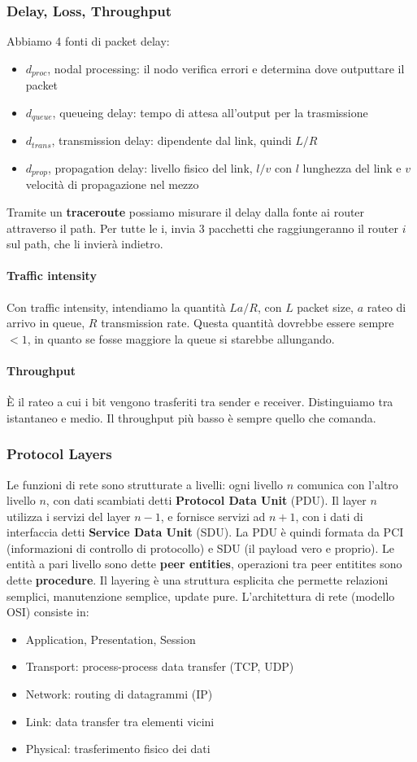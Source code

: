 \documentclass[11pt]{article}
\begin{document}
\subsubsection{Delay, Loss, Throughput}
Abbiamo 4 fonti di packet delay:
\begin{itemize}
    \item $d_{proc}$, nodal processing: il nodo verifica errori e determina dove outputtare il packet 
    \item $d_{queue}$, queueing delay: tempo di attesa all'output per la trasmissione
    \item $d_{trans}$, transmission delay: dipendente dal link, quindi $L/R$
    \item $d_{prop}$, propagation delay: livello fisico del link, $l/v$ con $l$ lunghezza del link e $v$ velocità di propagazione nel mezzo 
\end{itemize}
Tramite un \textbf{traceroute} possiamo misurare il delay dalla fonte ai router attraverso il path. Per tutte le i, invia 3 pacchetti che raggiungeranno il router $i$ sul path, che li invierà indietro. 
\paragraph{Traffic intensity} Con traffic intensity, intendiamo la quantità $La/R$, con $L$ packet size, $a$ rateo di arrivo in queue, $R$ transmission rate. Questa quantità dovrebbe essere sempre $<1$, in quanto se fosse maggiore la queue si starebbe allungando.
\paragraph{Throughput} È il rateo a cui i bit vengono trasferiti tra sender e receiver. Distinguiamo tra istantaneo e medio. Il throughput più basso è sempre quello che comanda.
\subsubsection{Protocol Layers}
Le funzioni di rete sono strutturate a livelli: ogni livello $n$ comunica con l'altro livello $n$, con dati scambiati detti \textbf{Protocol Data Unit} (PDU). Il layer $n$ utilizza i servizi del layer $n-1$, e fornisce servizi ad $n+1$, con i dati di interfaccia detti \textbf{Service Data Unit} (SDU). La PDU è quindi formata da PCI (informazioni di controllo di protocollo) e SDU (il payload vero e proprio). Le entità a pari livello sono dette \textbf{peer entities}, operazioni tra peer entitites sono dette \textbf{procedure}. Il layering è una struttura esplicita che permette relazioni semplici, manutenzione semplice, update pure. 
L'architettura di rete (modello OSI) consiste in:
\begin{itemize}
    \item Application, Presentation, Session 
    \item Transport: process-process data transfer (TCP, UDP)
    \item Network: routing di datagrammi (IP)
    \item Link: data transfer tra elementi vicini 
    \item Physical: trasferimento fisico dei dati 
\end{itemize}
\end{document}
